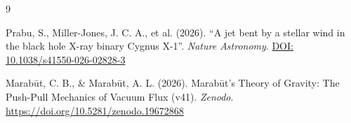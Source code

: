 \documentclass[11pt, a4paper]{article}
\newcommand{\doi}[1]{\href{https://doi.org/#1}{DOI: #1}}
\begin{document}
\begin{thebibliography}{9}

Prabu, S., Miller-Jones, J. C. A., et al. (2026). ``A jet bent by a stellar wind in the black hole X-ray binary Cygnus X-1''. \textit{Nature Astronomy}.
\doi{10.1038/s41550-026-02828-3}

Marab\={u}t, C. B., \& Marab\={u}t, A. L. (2026). Marab\={u}t's Theory of Gravity: The Push-Pull Mechanics of Vacuum Flux (v41). \textit{Zenodo}.
\url{https://doi.org/10.5281/zenodo.19672868}

\end{thebibliography}
\end{document}
